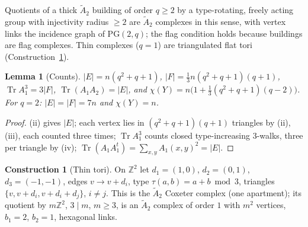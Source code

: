 \documentclass[11pt]{amsart}
\numberwithin{equation}{section}
\newtheorem{lemma}[theorem]{Lemma}
\theoremstyle{definition}
\newtheorem{construction}[theorem]{Construction}
\theoremstyle{remark}
\newcommand{\Z}{\mathbb{Z}}
\newcommand{\Tr}{\operatorname{Tr}}
\newcommand{\PG}{\mathrm{PG}}
\newcommand{\Atwo}{\widetilde A_2}
\begin{document}
Quotients of a thick $\Atwo$ building of order $q\ge2$ by a type-rotating, freely acting
group with injectivity radius $\ge2$ are $\Atwo$ complexes in this sense, with vertex links
the incidence graph of $\PG(2,q)$; the flag condition holds because buildings are flag
complexes. Thin complexes ($q=1$) are triangulated flat tori (Construction~\ref{con:thin}).

\begin{lemma}[Counts]\label{lem:counts}
$|E|=n(q^{2}+q+1)$, $|F|=\tfrac13n(q^{2}+q+1)(q+1)$, $\Tr A_1^{3}=3|F|$,
$\Tr(A_1A_2)=|E|$, and $\chi(Y)=n\bigl(1+\tfrac13(q^{2}+q+1)(q-2)\bigr)$. For $q=2$:
$|E|=|F|=7n$ and $\chi(Y)=n$.
\end{lemma}

\begin{proof}
(ii) gives $|E|$; each vertex lies in $(q^{2}+q+1)(q+1)$ triangles by (ii),(iii), each
counted three times; $\Tr A_1^{3}$ counts closed type-increasing $3$-walks, three per
triangle by (iv); $\Tr(A_1A_1^{t})=\sum_{x,y}A_1(x,y)^{2}=|E|$.
\end{proof}

\begin{construction}[Thin tori]\label{con:thin}
On $\Z^{2}$ let $d_1=(1,0)$, $d_2=(0,1)$, $d_3=(-1,-1)$, edges $v\to v+d_i$, type
$\tau(a,b)=a+b\bmod3$, triangles $\{v,v+d_i,v+d_i+d_j\}$, $i\neq j$. This is the
$\Atwo$ Coxeter complex (one apartment); its quotient by $m\Z^{2}$, $3\mid m$, $m\ge3$, is an
$\Atwo$ complex of order $1$ with $m^{2}$ vertices, $b_1=2$, $b_2=1$, hexagonal links.
\end{construction}
\end{document}
